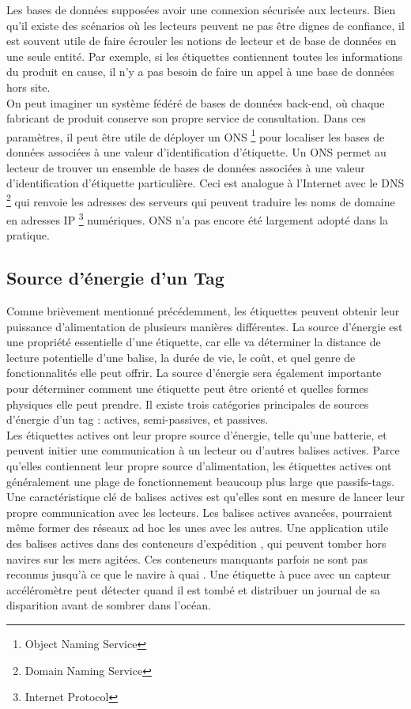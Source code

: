 \documentclass[11pt, a4paper, twoside]{book}
\begin{document}
Les bases de données supposées avoir une connexion sécurisée aux lecteurs. Bien qu'il existe des scénarios où les lecteurs peuvent ne pas être dignes de confiance, il est souvent utile de faire écrouler les notions de lecteur et de base de données en une seule entité. Par exemple, si les étiquettes contiennent toutes les informations du produit en cause, il n'y a pas besoin de faire un appel à une base de données hors site.\\

On peut imaginer un système fédéré de bases de données back-end, où chaque fabricant de produit conserve son propre service de consultation. Dans ces paramètres, il peut être utile de déployer un ONS \footnote{Object Naming Service} pour localiser les bases de données associées à une valeur d'identification d'étiquette. Un ONS permet au lecteur de trouver un ensemble de bases de données associées à une valeur d'identification d'étiquette particulière. Ceci est analogue à l'Internet avec le DNS \footnote{Domain Naming Service} qui renvoie les adresses des serveurs qui peuvent traduire les noms de domaine en adresses IP \footnote{Internet Protocol} numériques. ONS n'a pas encore été largement adopté dans la pratique.
\subsection{Source d'énergie d'un Tag}
Comme brièvement mentionné précédemment, les étiquettes peuvent obtenir leur puissance d'alimentation de plusieurs manières différentes. La source d'énergie est une propriété essentielle d'une étiquette, car elle va déterminer la distance de lecture potentielle d'une balise, la durée de vie, le coût, et quel genre de fonctionnalités elle peut offrir. La source d'énergie sera également importante pour déterminer comment une étiquette peut être orienté et quelles formes physiques elle peut prendre. Il existe trois catégories principales de sources d'énergie d'un tag : actives, semi-passives, et passives.\\

 Les étiquettes actives ont leur propre source d'énergie, telle qu'une batterie, et peuvent initier une communication à un lecteur ou d'autres balises actives. Parce qu'elles contiennent leur propre source d'alimentation, les étiquettes actives ont généralement une plage de fonctionnement beaucoup plus large que passifs-tags. Une caractéristique clé de balises actives est qu'elles sont en mesure de lancer leur propre communication avec les lecteurs. Les balises actives avancées, pourraient même former des réseaux ad hoc les unes avec les autres. Une application utile des balises actives dans des conteneurs d'expédition , qui peuvent tomber hors navires sur les mers agitées. Ces conteneurs manquants parfois ne sont pas reconnus jusqu'à ce que le navire à quai . Une étiquette à puce avec un capteur accéléromètre peut détecter quand il est tombé et distribuer un journal de sa disparition avant de sombrer dans l'océan.\\
\end{document}
